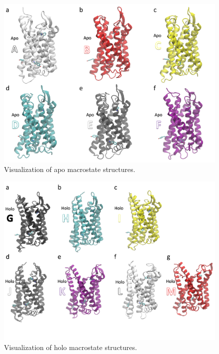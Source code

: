 \begin{figure}[htbp]
\centering
\includegraphics[width=\textwidth]{./figures/apo-centroids.png}
\caption{Visualization of apo macrostate structures.}
\label{fig:apo-centroids}
\end{figure}

\begin{figure}[htbp]
\centering
\includegraphics[width=\textwidth]{./figures/holo-centroids.png}
\caption{Visualization of holo macrostate structures.}
\label{fig:holo-centroids}
\end{figure}